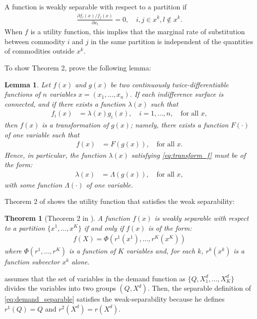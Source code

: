\documentclass[11pt, a4paper]{article}
\newtheorem{theorem}{Theorem}
\newtheorem{lemma}{Lemma}
\theoremstyle{remark}
\begin{document}
A function is weakly separable with respect to a partition if 
\begin{align}
    \frac{\partial f_i(x)/ f_j(x)}{\partial x_l} = 0, \quad i,j\in x^k, l \notin x^k.
\end{align}
When $f$ is a utility function, this implies that the marginal rate of substitution between commodity $i$ and $j$ in the same partition is independent of the quantities of commodities outside $x^k$.

To show Theorem 2, \citet{goldmanNote1964} prove the following lemma:
\begin{lemma}\label{lemma_1_GU}
    Let $f(x)$ and $g(x)$ be two continuously twice-differentiable functions of $n$ variables $x=(x_1, \dots, x_n)$. If each indifference surface is connected, and if there exists a function $\lambda(x)$ such that
    \begin{align}
    f_i(x) &= \lambda(x)g_i(x), \quad i=1, \dots, n, \quad \text{for all } x, \label{eq:transform_f}
    \end{align}
    then $f(x)$ is a transformation of $g(x)$; namely, there exists a function $F(\cdot)$ of one variable such that
    \begin{align}
    f(x) &= F(g(x)), \quad \text{for all } x.
    \end{align}
    Hence, in particular, the function $\lambda(x)$ satisfying \eqref{eq:transform_f} must be of the form:
    \begin{align}
        \lambda(x) &= \Lambda(g(x)), \quad \text{for all } x,
    \end{align}
    with some function $\Lambda(\cdot)$ of one variable.
\end{lemma}

Theorem 2 of \citet{goldmanNote1964} shows the utility function that satisfies the weak separability:
\begin{theorem}[Theorem 2 in \citet{goldmanNote1964}]\label{thorem_2_GU}
    A function $f(x)$ is weakly separable with respect to a partition $\{x^1, .. ., x^K\}$ if and only if $f(x)$ is of the form: 
    \begin{align}
        f(X) = \Phi(r^1(x^{1}),\ldots, r^K(x^{K})   )
    \end{align} where $\Phi(r^1,\ldots, r^K)$ is a function of $K$ variables and, for each $k$, $r^k(x^{k})$ is a function subvector $x^{k}$ alone.
\end{theorem}

\citet{lau1982identifying} assumes that the set of variables in the demand function as  $\{Q, X_{1}^{d},\ldots, X_{K}^{d}\}$  divides the variables into two groups $(Q, X^{d})$.
Then, the separable definition of \eqref{eq:demand_separable} satisfies the weak-separability because he defines $r^1(Q) = Q$ and $r^2(X^d) = r(X^d)$.
\end{document}
